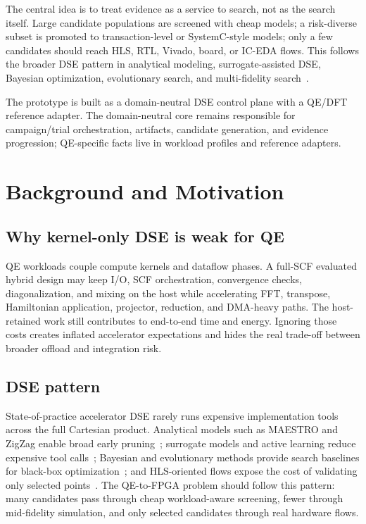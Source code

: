 \documentclass[sigconf,anonymous,review]{acmart}
\begin{document}
The central idea is to treat evidence as a service to search, not as the search itself.  Large candidate populations are screened with cheap models; a risk-diverse subset is promoted to transaction-level or SystemC-style models; only a few candidates should reach HLS, RTL, Vivado, board, or IC-EDA flows.  This follows the broader DSE pattern in analytical modeling, surrogate-assisted DSE, Bayesian optimization, evolutionary search, and multi-fidelity search~\cite{paria2019flexible,deb2002fast,zhang2020dnn,wu2013opentuner,kao2020confuciux}.

The prototype is built as a domain-neutral DSE control plane with a QE/DFT reference adapter.  The domain-neutral core remains responsible for campaign/trial orchestration, artifacts, candidate generation, and evidence progression; QE-specific facts live in workload profiles and reference adapters.

\section{Background and Motivation}

\subsection{Why kernel-only DSE is weak for QE}

QE workloads couple compute kernels and dataflow phases.  A full-SCF evaluated hybrid design may keep I/O, SCF orchestration, convergence checks, diagonalization, and mixing on the host while accelerating FFT, transpose, Hamiltonian application, projector, reduction, and DMA-heavy paths.  The host-retained work still contributes to end-to-end time and energy.  Ignoring those costs creates inflated accelerator expectations and hides the real trade-off between broader offload and integration risk.

\subsection{DSE pattern}

State-of-practice accelerator DSE rarely runs expensive implementation tools across the full Cartesian product.  Analytical models such as MAESTRO and ZigZag enable broad early pruning~\cite{kwon2019maestro,mei2021zigzag}; surrogate models and active learning reduce expensive tool calls~\cite{zhang2020dnn}; Bayesian and evolutionary methods provide search baselines for black-box optimization~\cite{paria2019flexible,deb2002fast}; and HLS-oriented flows expose the cost of validating only selected points~\cite{pilato2013legup}.  The QE-to-FPGA problem should follow this pattern: many candidates pass through cheap workload-aware screening, fewer through mid-fidelity simulation, and only selected candidates through real hardware flows.
\end{document}
